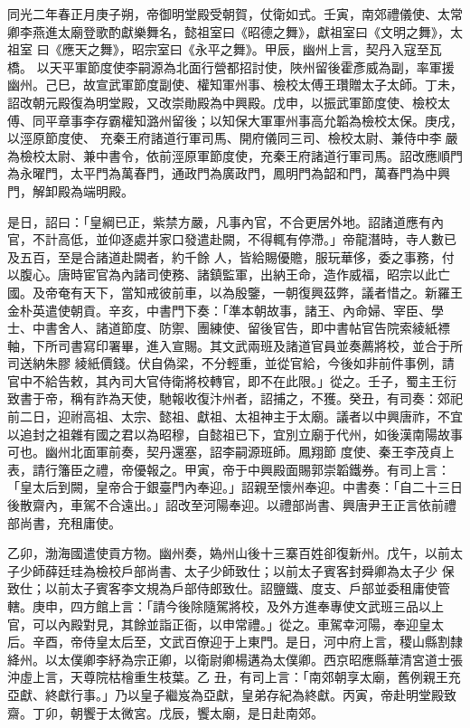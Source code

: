 
\begin{pinyinscope}
同光二年春正月庚子朔，帝御明堂殿受朝賀，仗衛如式。壬寅，南郊禮儀使、太常卿李燕進太廟登歌酌獻樂舞名，懿祖室曰《昭德之舞》，獻祖室曰《文明之舞》，太祖室
 曰《應天之舞》，昭宗室曰《永平之舞》。甲辰，幽州上言，契丹入寇至瓦橋。
 以天平軍節度使李嗣源為北面行營都招討使，陜州留後霍彥威為副，率軍援幽州。己巳，故宣武軍節度副使、權知軍州事、檢校太傅王瓚贈太子太師。丁未，詔改朝元殿復為明堂殿，又改崇勛殿為中興殿。戊申，以振武軍節度使、檢校太傅、同平章事李存霸權知潞州留後；以知保大軍軍州事高允韜為檢校太保。庚戌，以涇原節度使、
 充秦王府諸道行軍司馬、開府儀同三司、檢校太尉、兼侍中李嚴為檢校太尉、兼中書令，依前涇原軍節度使，充秦王府諸道行軍司馬。詔改應順門為永曜門，太平門為萬春門，通政門為廣政門，鳳明門為韶和門，萬春門為中興門，解卸殿為端明殿。



 是日，詔曰：「皇綱已正，紫禁方嚴，凡事內官，不合更居外地。詔諸道應有內官，不計高低，並仰逐處并家口發遣赴闕，不得輒有停滯。」帝龍潛時，寺人數已及五百，至是合諸道赴闕者，約千餘
 人，皆給賜優贍，服玩華侈，委之事務，付以腹心。唐時宦官為內諸司使務、諸鎮監軍，出納王命，造作威福，昭宗以此亡國。及帝奄有天下，當知戒彼前車，以為殷鑒，一朝復興茲弊，議者惜之。新羅王金朴英遣使朝貢。辛亥，中書門下奏：「準本朝故事，諸王、內命婦、宰臣、學士、中書舍人、諸道節度、防禦、團練使、留後官告，即中書帖官告院索綾紙褾軸，下所司書寫印署畢，進入宣賜。其文武兩班及諸道官員並奏薦將校，並合于所司送納朱膠
 綾紙價錢。伏自偽梁，不分輕重，並從官給，今後如非前件事例，請官中不給告敕，其內司大官侍衛將校轉官，即不在此限。」從之。壬子，蜀主王衍致書于帝，稱有詐為天使，馳報收復汴州者，詔捕之，不獲。癸丑，有司奏：郊祀前二日，迎祔高祖、太宗、懿祖、獻祖、太祖神主于太廟。議者以中興唐祚，不宜以追封之祖雜有國之君以為昭穆，自懿祖已下，宜別立廟于代州，如後漢南陽故事可也。幽州北面軍前奏，契丹還塞，詔李嗣源班師。鳳翔節
 度使、秦王李茂貞上表，請行籓臣之禮，帝優報之。甲寅，帝于中興殿面賜郭崇韜鐵券。有司上言：「皇太后到闕，皇帝合于銀臺門內奉迎。」詔親至懷州奉迎。中書奏：「自二十三日後散齋內，車駕不合遠出。」詔改至河陽奉迎。以禮部尚書、興唐尹王正言依前禮部尚書，充租庸使。



 乙卯，渤海國遣使貢方物。幽州奏，媯州山後十三寨百姓卻復新州。戊午，以前太子少師薛廷珪為檢校戶部尚書、太子少師致仕；以前太子賓客封舜卿為太子少
 保致仕；以前太子賓客李文規為戶部侍郎致仕。詔鹽鐵、度支、戶部並委租庸使管轄。庚申，四方館上言：「請今後除隨駕將校，及外方進奉專使文武班三品以上官，可以內殿對見，其餘並詣正衙，以申常禮。」從之。車駕幸河陽，奉迎皇太后。辛酉，帝侍皇太后至，文武百僚迎于上東門。是日，河中府上言，稷山縣割隸絳州。以太僕卿李紓為宗正卿，以衛尉卿楊遘為太僕卿。西京昭應縣華清宮道士張沖虛上言，天尊院枯檜重生枝葉。乙
 丑，有司上言：「南郊朝享太廟，舊例親王充亞獻、終獻行事。」乃以皇子繼岌為亞獻，皇弟存紀為終獻。丙寅，帝赴明堂殿致齋。丁卯，朝饗于太微宮。戊辰，饗太廟，是日赴南郊。




\end{pinyinscope}

